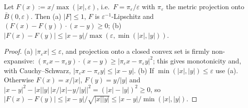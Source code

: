 \begin{lemma}\label{lem:D2-field}
Let $F(x):=x/\max(|x|,\varepsilon)$, i.e.\ $F=\pi_\varepsilon/\varepsilon$ with $\pi_\varepsilon$ the metric projection onto
$\bar B(0,\varepsilon)$. Then (a) $|F|\le1$, $F$ is $\varepsilon^{-1}$-Lipschitz and $(F(x)-F(y))\cdot(x-y)\ge0$;
(b) $|F(x)-F(y)|\le|x-y|/\max(\varepsilon,\min(|x|,|y|))$.
\end{lemma}
\begin{proof}
(a) $|\pi_\varepsilon x|\le\varepsilon$, and projection onto a closed convex set is firmly non-expansive:
$(\pi_\varepsilon x-\pi_\varepsilon y)\cdot(x-y)\ge|\pi_\varepsilon x-\pi_\varepsilon y|^2$; this gives monotonicity and, with
Cauchy--Schwarz, $|\pi_\varepsilon x-\pi_\varepsilon y|\le|x-y|$. (b) If $\min(|x|,|y|)\le\varepsilon$ use (a). Otherwise
$F(x)=x/|x|$, $F(y)=y/|y|$ and $|x-y|^2-|x||y|\,|x/|x|-y/|y||^2=(|x|-|y|)^2\ge0$, so
$|F(x)-F(y)|\le|x-y|/\sqrt{|x||y|}\le|x-y|/\min(|x|,|y|)$.
\end{proof}

